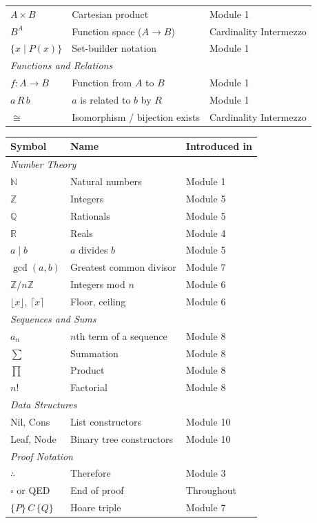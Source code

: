 \documentclass[11pt]{article}
\begin{document}
{\begin{center}
\begin{tabular}{lll}
$A \times B$ & Cartesian product & Module 1 \\
$B^A$ & Function space ($A \to B$) & Cardinality Intermezzo \\
$\{x \mid P(x)\}$ & Set-builder notation & Module 1 \\
\midrule
\multicolumn{3}{l}{\textit{Functions and Relations}} \\[2pt]
$f : A \to B$ & Function from $A$ to $B$ & Module 1 \\
$a\, R\, b$ & $a$ is related to $b$ by $R$ & Module 1 \\
$\cong$ & Isomorphism / bijection exists & Cardinality Intermezzo \\
\bottomrule
\end{tabular}
\end{center}
}

\clearpage

{\small
\begin{center}
\begin{tabular}{lll}
\toprule
\textbf{Symbol} & \textbf{Name} & \textbf{Introduced in} \\
\midrule
\multicolumn{3}{l}{\textit{Number Theory}} \\[2pt]
$\mathbb{N}$ & Natural numbers & Module 1 \\
$\mathbb{Z}$ & Integers & Module 5 \\
$\mathbb{Q}$ & Rationals & Module 5 \\
$\mathbb{R}$ & Reals & Module 4 \\
$a \mid b$ & $a$ divides $b$ & Module 5 \\
$\gcd(a,b)$ & Greatest common divisor & Module 7 \\
$\mathbb{Z}/n\mathbb{Z}$ & Integers mod $n$ & Module 6 \\
$\lfloor x \rfloor$, $\lceil x \rceil$ & Floor, ceiling & Module 6 \\
\midrule
\multicolumn{3}{l}{\textit{Sequences and Sums}} \\[2pt]
$a_n$ & $n$th term of a sequence & Module 8 \\
$\sum$ & Summation & Module 8 \\
$\prod$ & Product & Module 8 \\
$n!$ & Factorial & Module 8 \\
\midrule
\multicolumn{3}{l}{\textit{Data Structures}} \\[2pt]
Nil, Cons & List constructors & Module 10 \\
Leaf, Node & Binary tree constructors & Module 10 \\
\midrule
\multicolumn{3}{l}{\textit{Proof Notation}} \\[2pt]
$\therefore$ & Therefore & Module 3 \\
$\square$ or QED & End of proof & Throughout \\
$\{P\}\,C\,\{Q\}$ & Hoare triple & Module 7 \\
\bottomrule
\end{tabular}
\end{center}
}
\end{document}
